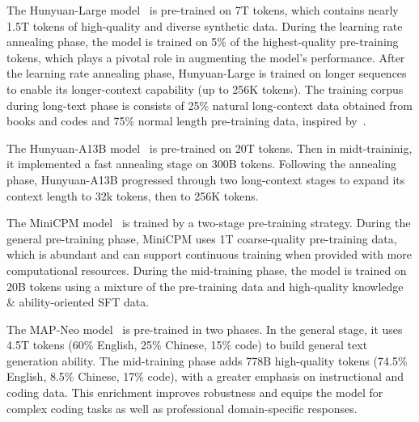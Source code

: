 The Hunyuan-Large model~\cite{sun2024hunyuan} is pre-trained on 7T tokens, which contains nearly 1.5T tokens of high-quality and diverse synthetic data. During the learning rate annealing phase, the model is trained on 5\% of the highest-quality pre-training tokens, which plays a pivotal role in augmenting the model's performance. After the learning rate annealing phase, Hunyuan-Large is trained on longer sequences to enable its longer-context capability (up to 256K tokens). The training corpus during long-text phase is consists of 25\% natural long-context data obtained from books and codes and 75\% normal length pre-training data, inspired by~\cite{gao2024train}.

The Hunyuan-A13B model~\cite{yang2025qwen3} is pre-trained on 20T tokens. Then in midt-traininig, it implemented a fast annealing stage on 300B tokens. Following the annealing phase, Hunyuan-A13B progressed through two long-context stages to expand its context length to 32k tokens, then to 256K tokens.

The MiniCPM model~\cite{hu2024minicpm} is trained by a two-stage pre-training strategy. During the general pre-training phase, MiniCPM uses 1T coarse-quality pre-training data, which is abundant and can support continuous training when provided with more computational resources. During the mid-training phase, the model is trained on 20B tokens using a mixture of the pre-training data and high-quality knowledge \& ability-oriented SFT data.

The MAP-Neo model~\cite{Zhang2024MAPNeoHC} is pre-trained in two phases. In the general stage, it uses 4.5T tokens (60\% English, 25\% Chinese, 15\% code) to build general text generation ability. The mid-training phase adds 778B high-quality tokens (74.5\% English, 8.5\% Chinese, 17\% code), with a greater emphasis on instructional and coding data. This enrichment improves robustness and equips the model for complex coding tasks as well as professional domain-specific responses.

